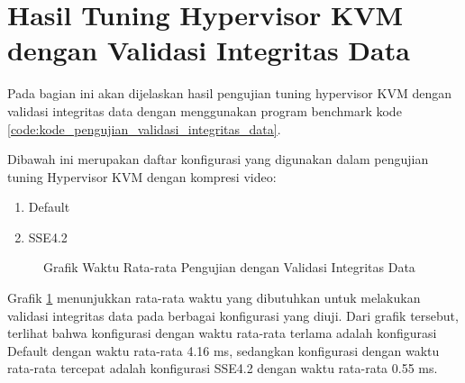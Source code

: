 \section{Hasil Tuning Hypervisor KVM dengan Validasi Integritas Data}
Pada bagian ini akan dijelaskan hasil pengujian tuning hypervisor KVM dengan validasi integritas data dengan menggunakan program benchmark kode \ref{code:kode_pengujian_validasi_integritas_data}.

Dibawah ini merupakan daftar konfigurasi yang digunakan dalam pengujian tuning Hypervisor KVM dengan kompresi video:

\begin{enumerate}
    \item Default
    \item SSE4.2
\end{enumerate}

\begin{figure}
    \centering
    \caption{Grafik Waktu Rata-rata Pengujian dengan Validasi Integritas Data}
    \label{fig:file_integrity_test_average_graph}
\end{figure}

Grafik \ref{fig:file_integrity_test_average_graph} menunjukkan rata-rata waktu yang dibutuhkan untuk melakukan validasi integritas data pada berbagai konfigurasi yang diuji. Dari grafik tersebut, terlihat bahwa konfigurasi dengan waktu rata-rata terlama adalah konfigurasi Default dengan waktu rata-rata 4.16 ms, sedangkan konfigurasi dengan waktu rata-rata tercepat adalah konfigurasi SSE4.2 dengan waktu rata-rata 0.55 ms.

